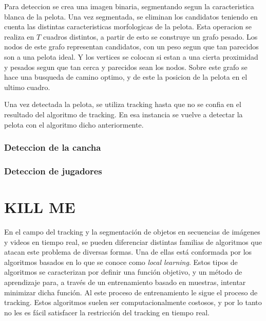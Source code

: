 \documentclass[a4paper,10pt]{article}
\begin{document}
Para deteccion se crea una imagen binaria, segmentando segun la caracteristica blanca de la pelota.
Una vez segmentada, se eliminan los candidatos teniendo en cuenta las distintas caracteristicas morfologicas de la pelota. 
Esta operacion se realiza en $T$ cuadros distintos, a partir de esto se construye un grafo pesado.
Los nodos de este grafo representan candidatos, con un peso segun que tan parecidos son a una pelota ideal.
Y los vertices se colocan si estan a una cierta proximidad y pesados segun que tan cerca y parecidos sean los nodos.
Sobre este grafo se hace una busqueda de camino optimo, y de este la posicion de la pelota en el ultimo cuadro.

Una vez detectada la pelota, se utiliza tracking hasta que no se confia en el resultado del algoritmo de tracking.
En esa instancia se vuelve a detectar la pelota con el algoritmo dicho anteriormente.

\subsubsection*{Deteccion de la cancha}

\subsubsection*{Deteccion de jugadores}


\section{KILL ME}

En el campo del tracking y la segmentación de objetos en secuencias de imágenes y videos en tiempo real, se pueden diferenciar distintas familias de 
algoritmos que atacan este problema de diversas formas. Una de ellas está conformada por los algoritmos basados en lo que se conoce como \textit{local learning}.
\cite{local-learning}
Estos tipos de algoritmos se caracterizan por definir una función objetivo, y un método de aprendizaje para, a través de un entrenamiento basado en 
muestras, intentar minimizar dicha función. Al este proceso de entrenamiento le sigue el proceso de tracking. Estos algoritmos suelen ser computacionalmente costosos, y 
por lo tanto no les es fácil satisfacer la restricción del tracking en tiempo real.\\
\end{document}
